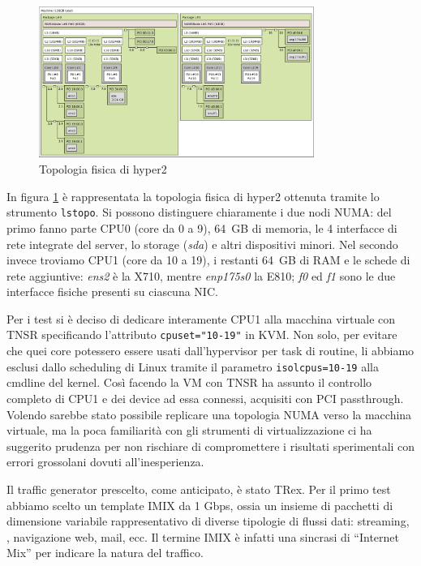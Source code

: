 \begin{figure}[htb]
    \includegraphics[width=0.8\textwidth]{graphics/hyper2topohd.png}
    \caption{Topologia fisica di hyper2}
    \label{fig:hyper2topo}
\end{figure}

In figura \ref{fig:hyper2topo} è rappresentata la topologia fisica di hyper2 ottenuta tramite lo strumento \verb|lstopo|. Si possono distinguere chiaramente i due nodi NUMA: del primo fanno parte \mbox{CPU0} (core da 0 a 9), \mbox{64 GB} di memoria, le 4 interfacce di rete integrate del server, lo storage (\textit{sda}) e altri dispositivi minori. Nel secondo invece troviamo CPU1 (core da 10 a 19), i restanti \mbox{64 GB} di RAM e le schede di rete aggiuntive: \textit{ens2} è la X710, mentre \textit{enp175s0} la E810; \textit{f0} ed \textit{f1} sono le due interfacce fisiche presenti su ciascuna NIC.

Per i test si è deciso di dedicare interamente CPU1 alla macchina virtuale con TNSR specificando l'attributo \verb|cpuset="10-19"| in KVM. Non solo, per evitare che quei core potessero essere usati dall'hypervisor per task di routine, li abbiamo esclusi dallo scheduling di Linux tramite il parametro \verb|isolcpus=10-19| alla cmdline del kernel. Così facendo la VM con TNSR ha assunto il controllo completo di CPU1 e dei device ad essa connessi, acquisiti con PCI passthrough. Volendo sarebbe stato possibile replicare una topologia NUMA verso la macchina virtuale, ma la poca familiarità con gli strumenti di virtualizzazione ci ha suggerito prudenza per non rischiare di compromettere i risultati sperimentali con errori grossolani dovuti all'inesperienza.

Il traffic generator prescelto, come anticipato, è stato TRex. Per il primo test abbiamo scelto un template IMIX da 1 Gbps, ossia un insieme di pacchetti di dimensione variabile rappresentativo di diverse tipologie di flussi dati: streaming, , navigazione web, mail, ecc. Il termine IMIX è infatti una sincrasi di ``Internet Mix'' per indicare la natura del traffico.

